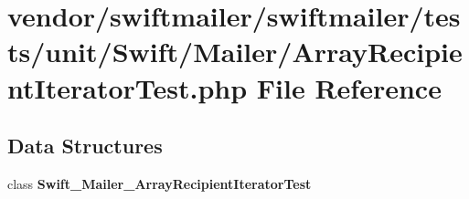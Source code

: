 \section{vendor/swiftmailer/swiftmailer/tests/unit/\+Swift/\+Mailer/\+Array\+Recipient\+Iterator\+Test.php File Reference}
\label{_array_recipient_iterator_test_8php}
\subsection*{Data Structures}
\begin{DoxyCompactItemize}
\item 
class {\bf Swift\+\_\+\+Mailer\+\_\+\+Array\+Recipient\+Iterator\+Test}
\end{DoxyCompactItemize}
